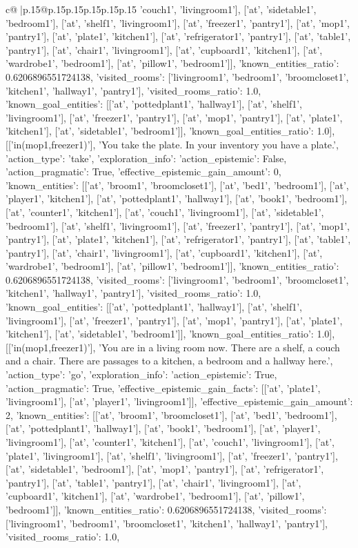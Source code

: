 \documentclass{article}
\begin{document}
{\begin{supertabular}{c@{$\;$}|p{.15\linewidth}@{}p{.15\linewidth}p{.15\linewidth}p{.15\linewidth}p{.15\linewidth}p{.15\linewidth}}
{{{'couch1', 'livingroom1'], ['at', 'sidetable1', 'bedroom1'], ['at', 'shelf1', 'livingroom1'], ['at', 'freezer1', 'pantry1'], ['at', 'mop1', 'pantry1'], ['at', 'plate1', 'kitchen1'], ['at', 'refrigerator1', 'pantry1'], ['at', 'table1', 'pantry1'], ['at', 'chair1', 'livingroom1'], ['at', 'cupboard1', 'kitchen1'], ['at', 'wardrobe1', 'bedroom1'], ['at', 'pillow1', 'bedroom1']], 'known_entities_ratio': 0.6206896551724138, 'visited_rooms': ['livingroom1', 'bedroom1', 'broomcloset1', 'kitchen1', 'hallway1', 'pantry1'], 'visited_rooms_ratio': 1.0, 'known_goal_entities': [['at', 'pottedplant1', 'hallway1'], ['at', 'shelf1', 'livingroom1'], ['at', 'freezer1', 'pantry1'], ['at', 'mop1', 'pantry1'], ['at', 'plate1', 'kitchen1'], ['at', 'sidetable1', 'bedroom1']], 'known_goal_entities_ratio': 1.0}}], [['in(mop1,freezer1)'], 'You take the plate. In your inventory you have a plate.', {'action_type': 'take', 'exploration_info': {'action_epistemic': False, 'action_pragmatic': True, 'effective_epistemic_gain_amount': 0, 'known_entities': [['at', 'broom1', 'broomcloset1'], ['at', 'bed1', 'bedroom1'], ['at', 'player1', 'kitchen1'], ['at', 'pottedplant1', 'hallway1'], ['at', 'book1', 'bedroom1'], ['at', 'counter1', 'kitchen1'], ['at', 'couch1', 'livingroom1'], ['at', 'sidetable1', 'bedroom1'], ['at', 'shelf1', 'livingroom1'], ['at', 'freezer1', 'pantry1'], ['at', 'mop1', 'pantry1'], ['at', 'plate1', 'kitchen1'], ['at', 'refrigerator1', 'pantry1'], ['at', 'table1', 'pantry1'], ['at', 'chair1', 'livingroom1'], ['at', 'cupboard1', 'kitchen1'], ['at', 'wardrobe1', 'bedroom1'], ['at', 'pillow1', 'bedroom1']], 'known_entities_ratio': 0.6206896551724138, 'visited_rooms': ['livingroom1', 'bedroom1', 'broomcloset1', 'kitchen1', 'hallway1', 'pantry1'], 'visited_rooms_ratio': 1.0, 'known_goal_entities': [['at', 'pottedplant1', 'hallway1'], ['at', 'shelf1', 'livingroom1'], ['at', 'freezer1', 'pantry1'], ['at', 'mop1', 'pantry1'], ['at', 'plate1', 'kitchen1'], ['at', 'sidetable1', 'bedroom1']], 'known_goal_entities_ratio': 1.0}}], [['in(mop1,freezer1)'], 'You are in a living room now. There are a shelf, a couch and a chair. There are passages to a kitchen, a bedroom and a hallway here.', {'action_type': 'go', 'exploration_info': {'action_epistemic': True, 'action_pragmatic': True, 'effective_epistemic_gain_facts': [['at', 'plate1', 'livingroom1'], ['at', 'player1', 'livingroom1']], 'effective_epistemic_gain_amount': 2, 'known_entities': [['at', 'broom1', 'broomcloset1'], ['at', 'bed1', 'bedroom1'], ['at', 'pottedplant1', 'hallway1'], ['at', 'book1', 'bedroom1'], ['at', 'player1', 'livingroom1'], ['at', 'counter1', 'kitchen1'], ['at', 'couch1', 'livingroom1'], ['at', 'plate1', 'livingroom1'], ['at', 'shelf1', 'livingroom1'], ['at', 'freezer1', 'pantry1'], ['at', 'sidetable1', 'bedroom1'], ['at', 'mop1', 'pantry1'], ['at', 'refrigerator1', 'pantry1'], ['at', 'table1', 'pantry1'], ['at', 'chair1', 'livingroom1'], ['at', 'cupboard1', 'kitchen1'], ['at', 'wardrobe1', 'bedroom1'], ['at', 'pillow1', 'bedroom1']], 'known_entities_ratio': 0.6206896551724138, 'visited_rooms': ['livingroom1', 'bedroom1', 'broomcloset1', 'kitchen1', 'hallway1', 'pantry1'], 'visited_rooms_ratio': 1.0, }}}
\end{supertabular}}
\end{document}
